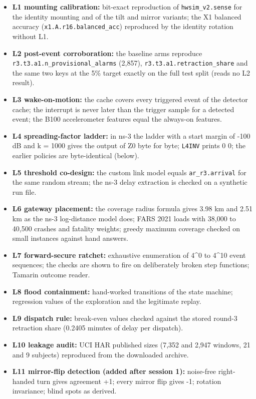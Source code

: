 \begin{itemize}
\item \textbf{L1 mounting calibration:} bit-exact reproduction of \texttt{hwsim\_v2.sense} for the identity mounting and of the tilt and mirror variants; the X1 balanced accuracy (\texttt{x1.A.r16.balanced\_acc}) reproduced by the identity rotation without L1.
\item \textbf{L2 post-event corroboration:} the baseline arms reproduce \texttt{r3.t3.a1.n\_provisional\_alarms} (2,857), \texttt{r3.t3.a1.retraction\_share} and the same two keys at the 5\% target exactly on the full test split (reads no L2 result).
\item \textbf{L3 wake-on-motion:} the cache covers every triggered event of the detector cache; the interrupt is never later than the trigger sample for a detected event; the B100 accelerometer features equal the always-on features.
\item \textbf{L4 spreading-factor ladder:} in ns-3 the ladder with a start margin of -100 dB and k = 1000 gives the output of Z0 byte for byte; \texttt{L4INV} prints 0 0; the earlier policies are byte-identical (below).
\item \textbf{L5 threshold co-design:} the custom link model equals \texttt{ar\_r3.arrival} for the same random stream; the ns-3 delay extraction is checked on a synthetic run file.
\item \textbf{L6 gateway placement:} the coverage radius formula gives 3.98 km and 2.51 km as the ns-3 log-distance model does; FARS 2021 loads with 38,000 to 40,500 crashes and fatality weights; greedy maximum coverage checked on small instances against hand answers.
\item \textbf{L7 forward-secure ratchet:} exhaustive enumeration of 4\textasciicircum{}0 to 4\textasciicircum{}10 event sequences; the checks are shown to fire on deliberately broken step functions; Tamarin outcome reader.
\item \textbf{L8 flood containment:} hand-worked transitions of the state machine; regression values of the exploration and the legitimate replay.
\item \textbf{L9 dispatch rule:} break-even values checked against the stored round-3 retraction share (0.2405 minutes of delay per dispatch).
\item \textbf{L10 leakage audit:} UCI HAR published sizes (7,352 and 2,947 windows, 21 and 9 subjects) reproduced from the downloaded archive.
\item \textbf{L11 mirror-flip detection (added after session 1):} noise-free right-handed turn gives agreement +1; every mirror flip gives -1; rotation invariance; blind spots as derived.
\end{itemize}

